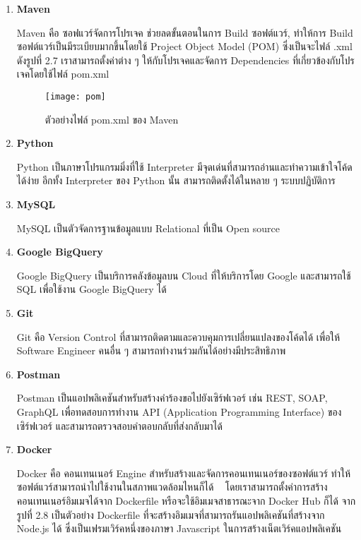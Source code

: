 \begin{enumerate}
	\item \textbf{Maven}
	
	Maven คือ ซอฟแวร์จัดการโปรเจค ช่วยลดขั้นตอนในการ Build ซอฟต์แวร์, ทำให้การ Build ซอฟต์แวร์เป็นมีระเบียบมากขึ้นโดยใช้ Project Object Model (POM) ซึ่งเป็นจะไฟล์ .xml ดังรูปที่ 2.7 เราสามารถตั้งค่าต่าง ๆ ให้กับโปรเจคและจัดการ Dependencies ที่เกี่ยวข้องกับโปรเจคโดยใช้ไฟล์ pom.xml ~\cite{maven}
	
	\begin{figure}[!h]
		\centering
		\texttt{[image: pom]}  
		\caption{ตัวอย่างไฟล์ pom.xml ของ Maven}
		\label{Fig:pom}
	\end{figure}
	
	\item \textbf{Python}
	
	Python เป็นภาษาโปรแกรมมิ่งที่ใช้ Interpreter มีจุดเด่นที่สามารถอ่านและทำความเข้าใจโค้ดได้ง่าย อีกทั้ง Interpreter ของ Python นั้น สามารถติดตั้งได้ในหลาย ๆ ระบบปฏิบัติการ ~\cite{python}
		
	\item \textbf{MySQL}
	
	MySQL เป็นตัวจัดการฐานข้อมูลแบบ Relational ที่เป็น Open source ~\cite{mysql}
	
	\item \textbf{Google BigQuery}
	
	Google BigQuery เป็นบริการคลังข้อมูลบน Cloud ที่ให้บริการโดย Google และสามารถใช้ SQL เพื่อใช้งาน Google BigQuery ได้ ~\cite{bigquery}
	
	\item \textbf{Git}
	
	Git คือ Version Control ที่สามารถติดตามและควบคุมการเปลี่ยนแปลงของโค้ดได้ เพื่อให้ Software Engineer คนอื่น ๆ สามารถทำงานร่วมกันได้อย่างมีประสิทธิภาพ ~\cite{git}

	\item \textbf{Postman}
	
	Postman เป็นแอปพลิเคชันสำหรับสร้างคำร้องขอไปยังเซิร์ฟเวอร์ เช่น REST, SOAP, GraphQL เพื่อทดสอบการทำงาน API (Application Programming Interface) ของเซิร์ฟเวอร์ และสามารถตรวจสอบคำตอบกลับที่ส่งกลับมาได้ ~\cite{postman}
	
	\item \textbf{Docker}
	
	Docker คือ คอนเทนเนอร์ Engine สำหรับสร้างและจัดการคอนเทนเนอร์ของซอฟต์แวร์ ทำให้ซอฟต์แวร์สามารถนำไปใช้งานในสภาพแวดล้อมไหนก็ได้ ~\cite{docker} โดยเราสามารถตั้งค่าการสร้างคอนเทนเนอร์อิมเมจได้จาก Dockerfile หรือจะใช้อิมเมจสาธารณะจาก Docker Hub ก็ได้ จากรูปที่ 2.8 เป็นตัวอย่าง Dockerfile ที่จะสร้างอิมเมจที่สามารถรันแอปพลิเคชันที่สร้างจาก Node.js ได้ ซึ่งเป็นเฟรมเวิร์คหนึ่งของภาษา Javascript ในการสร้างเน็ตเวิร์คแอปพลิเคชัน ~\cite{nodejs}
	

\end{enumerate}
